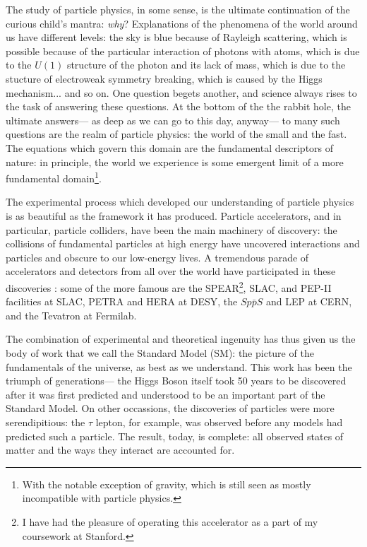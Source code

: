 \label{chapter:introduction}

The study of particle physics, in some sense, is the ultimate continuation of the curious child's mantra: \textit{why}? Explanations of the phenomena of the world around us have different levels: the sky is blue because of Rayleigh scattering, which is possible because of the particular interaction of photons with atoms, which is due to the $U(1)$ structure of the photon and its lack of mass, which is due to the stucture of electroweak symmetry breaking, which is caused by the Higgs mechanism... and so on. One question begets another, and science always rises to the task of answering these questions. At the bottom of the the rabbit hole, the ultimate answers--- as deep as we can go to this day, anyway--- to many such questions are the realm of particle physics: the world of the small and the fast. The equations which govern this domain are the fundamental descriptors of nature: in principle, the world we experience is some emergent limit of a more fundamental domain\footnote{With the notable exception of gravity, which is still seen as mostly incompatible with particle physics.}.

The experimental process which developed our understanding of particle physics is as beautiful as the framework it has produced. Particle accelerators, and in particular, particle colliders, have been the main machinery of discovery: the collisions of fundamental particles at high energy have uncovered interactions and particles and obscure to our low-energy lives. A tremendous parade of accelerators and detectors from all over the world have participated in these discoveries : some of the more famous are the SPEAR\footnote{I have had the pleasure of operating this accelerator as a part of my coursework at Stanford.}, SLAC, and PEP-II facilities at SLAC, PETRA and HERA at DESY, the $Sp\bar{p}S$ and LEP at CERN, and the Tevatron at Fermilab.  

The combination of experimental and theoretical ingenuity has thus given us the body of work that we call the Standard Model (SM): the picture of the fundamentals of the universe, as best as we understand. This work has been the triumph of generations--- the Higgs Boson itself took 50 years to be discovered after it was first predicted and understood to be an important part of the Standard Model.  On other occassions, the discoveries of particles were more serendipitious: the $\tau$ lepton, for example, was observed before any models had predicted such a particle.  The result, today, is complete: all observed states of matter and the ways they interact are accounted for.

